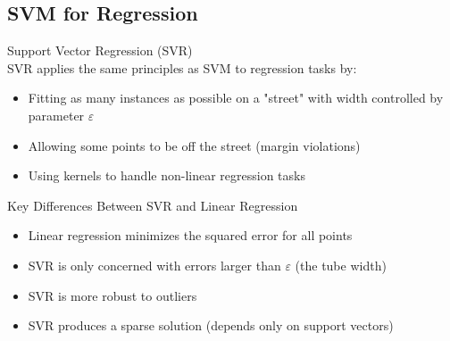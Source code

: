 \subsection{SVM for Regression}

\begin{definition}{Support Vector Regression (SVR)}\\
SVR applies the same principles as SVM to regression tasks by:
\begin{itemize}
    \item Fitting as many instances as possible on a "street" with width controlled by parameter $\varepsilon$
    \item Allowing some points to be off the street (margin violations)
    \item Using kernels to handle non-linear regression tasks
\end{itemize}
\end{definition}

\begin{concept}{Key Differences Between SVR and Linear Regression}
\begin{itemize}
    \item Linear regression minimizes the squared error for all points
    \item SVR is only concerned with errors larger than $\varepsilon$ (the tube width)
    \item SVR is more robust to outliers
    \item SVR produces a sparse solution (depends only on support vectors)
\end{itemize}
\end{concept}

